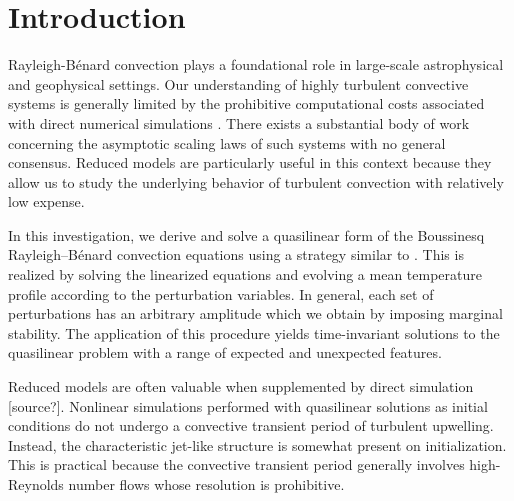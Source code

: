 \documentclass[reprint,amsmath,amssymb,aps]{revtex4-1}
\begin{document}
\section{Introduction}
Rayleigh-B\'enard convection plays a foundational role in large-scale astrophysical and geophysical settings. Our understanding of highly turbulent convective systems is generally limited by the prohibitive computational costs associated with direct numerical simulations \cite{Zhu}. There exists a substantial body of work concerning the asymptotic scaling laws of such systems with no general consensus. Reduced models are particularly useful in this context because they allow us to study the underlying behavior of turbulent convection with relatively low expense. 
\par In this investigation, we derive and solve a quasilinear form of the Boussinesq Rayleigh–Bénard convection equations using a strategy similar to \cite{Chini_sw}. This is realized by solving the linearized equations and evolving a mean temperature profile according to the perturbation variables. In general, each set of perturbations has an arbitrary amplitude which we obtain by imposing marginal stability. The application of this procedure yields time-invariant solutions to the quasilinear problem with a range of expected and unexpected features. 
\par Reduced models are often valuable when supplemented by direct simulation [source?]. Nonlinear simulations performed with quasilinear solutions as initial conditions do not undergo a convective transient period of turbulent upwelling. Instead, the characteristic jet-like structure is somewhat present on initialization. This is practical because the convective transient period generally involves high-Reynolds number flows whose resolution is prohibitive. 
\end{document}
